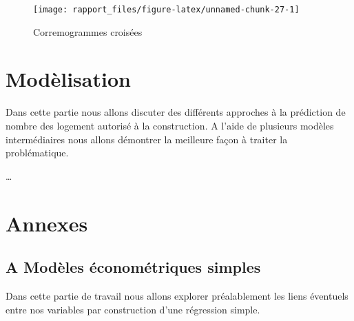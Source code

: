 \documentclass[11pt,]{article}
\begin{document}
\FloatBarrier

\FloatBarrier

\begin{figure}[!htbp]

{\centering \texttt{[image: rapport\_files/figure-latex/unnamed-chunk-27-1]} 

}

\caption{Corremogrammes croisées}\label{fig:unnamed-chunk-27}
\end{figure}

\FloatBarrier

\hypertarget{modelisation}{%
\section{Modèlisation}\label{modelisation}}

Dans cette partie nous allons discuter des différents approches à la
prédiction de nombre des logement autorisé à la construction. A l'aide
de plusieurs modèles intermédiaires nous allons démontrer la meilleure
façon à traiter la problématique.

\ldots{}

\hypertarget{annexes}{%
\section{Annexes}\label{annexes}}

\hypertarget{a-modeles-econometriques-simples}{%
\subsection{A Modèles économétriques
simples}\label{a-modeles-econometriques-simples}}

Dans cette partie de travail nous allons explorer préalablement les
liens éventuels entre nos variables par construction d'une régression
simple.

\FloatBarrier
\end{document}
